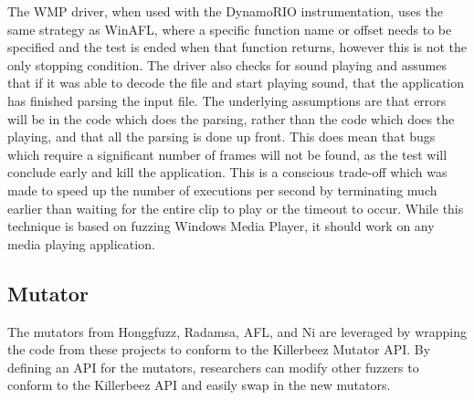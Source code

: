 The WMP driver, when used with the DynamoRIO instrumentation, uses the same strategy as WinAFL, where a specific function
name or offset needs to be specified and the test is ended when that function returns, however
this is not the only stopping condition. The driver also checks for sound
playing and assumes that if it was able to decode the file and start playing
sound, that the application has finished parsing the input file.
The underlying assumptions are that errors will be in the
code which does the parsing, rather than the code which does the playing, and that all
the parsing is done up front.  This does mean that bugs which require a
significant number of frames will not be found, as the test will conclude
early and kill the application.  This is a conscious trade-off which was made
to speed up the number of executions per second by terminating much earlier than
waiting for the entire clip to
play or the timeout to occur.  While this technique is based on fuzzing Windows Media Player,
it should work on any media playing application. 

\subsection{Mutator} \label{Mutator}
The mutators from Honggfuzz, Radamsa, AFL, and Ni are leveraged by wrapping the
code from these projects to conform to the Killerbeez Mutator API. By
defining an API for the mutators, researchers can modify other
fuzzers to conform to the Killerbeez API and easily swap in the new mutators.

